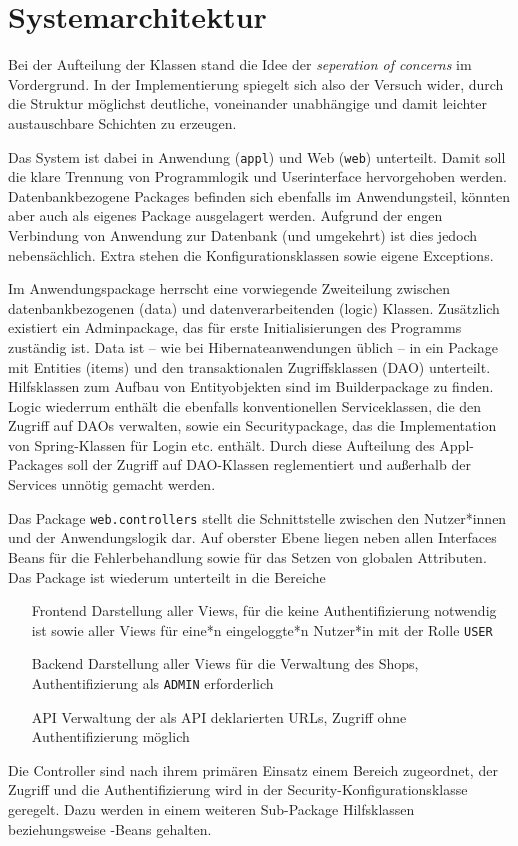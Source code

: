 \section{Systemarchitektur}

Bei der Aufteilung der Klassen stand die Idee der \textit{seperation of concerns} im Vordergrund. In der Implementierung spiegelt sich also der Versuch wider, durch die Struktur möglichst deutliche, voneinander unabhängige und damit leichter austauschbare Schichten zu erzeugen.


Das System ist dabei in Anwendung (\lstinline|appl|) und Web (\lstinline|web|) unterteilt. Damit soll die klare Trennung von Programmlogik und Userinterface hervorgehoben werden. Datenbankbezogene Packages befinden sich ebenfalls im Anwendungsteil, könnten aber auch als eigenes Package ausgelagert werden. Aufgrund der engen Verbindung von Anwendung zur Datenbank (und umgekehrt) ist dies jedoch nebensächlich. Extra stehen die Konfigurationsklassen sowie eigene Exceptions.

Im Anwendungspackage herrscht eine vorwiegende Zweiteilung zwischen datenbankbezogenen (data) und datenverarbeitenden (logic) Klassen. Zusätzlich existiert ein Adminpackage, das für erste Initialisierungen des Programms zuständig ist. Data ist -- wie bei Hibernateanwendungen üblich -- in ein Package mit Entities (items) und den transaktionalen Zugriffsklassen (DAO) unterteilt. Hilfsklassen zum Aufbau von Entityobjekten sind im Builderpackage zu finden. Logic wiederrum enthält die ebenfalls konventionellen Serviceklassen, die den Zugriff auf DAOs verwalten, sowie ein Securitypackage, das die Implementation von Spring-Klassen für Login etc. enthält. Durch diese Aufteilung des Appl-Packages soll der Zugriff auf DAO-Klassen reglementiert und außerhalb der Services unnötig gemacht werden.

Das Package \lstinline|web.controllers| stellt die Schnittstelle zwischen den Nutzer*innen und der Anwendungslogik dar. Auf oberster Ebene liegen neben allen Interfaces Beans für die Fehlerbehandlung sowie für das Setzen von globalen Attributen. Das Package ist wiederum unterteilt in die Bereiche
\begin{itemize}
	\item[Frontend] Darstellung aller Views, für die keine Authentifizierung notwendig ist sowie aller Views für eine*n eingeloggte*n Nutzer*in mit der Rolle \lstinline|USER|
	\item[Backend] Darstellung aller Views für die Verwaltung des Shops, Authentifizierung als \lstinline|ADMIN| erforderlich
	\item[API] Verwaltung der als API deklarierten URLs, Zugriff ohne Authentifizierung möglich
\end{itemize}
Die Controller sind nach ihrem primären Einsatz einem Bereich zugeordnet, der Zugriff und die Authentifizierung wird in der Security-Konfigurationsklasse geregelt. Dazu werden in einem weiteren Sub-Package Hilfsklassen beziehungsweise -Beans gehalten.